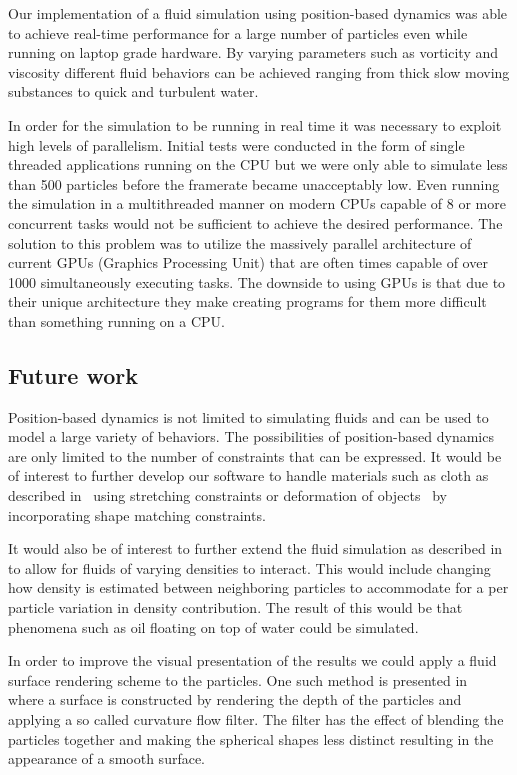 Our implementation of a fluid simulation using position-based dynamics was able
to achieve real-time performance for a large number of particles even while
running on laptop grade hardware. By varying parameters such as vorticity and
viscosity different fluid behaviors can be achieved ranging from thick slow
moving substances to quick and turbulent water.

In order for the simulation to be running in real time it was necessary to
exploit high levels of parallelism. Initial tests were conducted in the form
of single threaded applications running on the CPU but we were only able to
simulate less than 500 particles before the framerate became unacceptably low.
Even running the simulation in a multithreaded manner on modern CPUs capable of
8 or more concurrent tasks would not be sufficient to achieve the desired
performance. The solution to this problem was to utilize the massively parallel
architecture of current GPUs (Graphics Processing Unit) that are often times
capable of over 1000 simultaneously executing tasks. The downside to using GPUs
is that due to their unique architecture they make creating programs for them
more difficult than something running on a CPU.

\subsection{Future work}
Position-based dynamics is not limited to simulating
fluids and can be used to model a large variety of behaviors. The possibilities
of position-based dynamics are only limited to the number of constraints that
can be expressed. It would be of interest to further develop our software to
handle materials such as cloth as described in~\cite{muller2007position} using
stretching constraints or deformation of objects~\cite{muller2005meshless} by
incorporating shape matching constraints.

It would also be of interest to further extend the fluid simulation as
described in~\cite{macklin2014unified} to allow for fluids of varying densities
to interact. This would include changing how density is estimated between
neighboring particles to accommodate for a per particle variation in density
contribution. The result of this would be that phenomena such as oil floating
on top of water could be simulated.

In order to improve the visual presentation of the results we could apply a
fluid surface rendering scheme to the particles. One such method is presented
in~\cite{van2009screen} where a surface is constructed by rendering the depth
of the particles and applying a so called curvature flow filter. The filter has
the effect of blending the particles together and making the spherical shapes
less distinct resulting in the appearance of a smooth surface.

